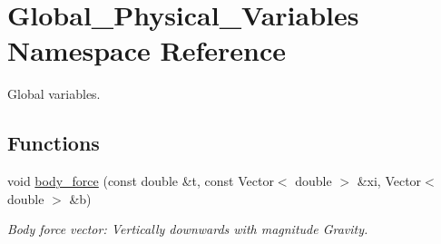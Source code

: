 \hypertarget{namespaceGlobal__Physical__Variables}{}\section{Global\+\_\+\+Physical\+\_\+\+Variables Namespace Reference}
\label{namespaceGlobal__Physical__Variables}


Global variables.  


\subsection*{Functions}
\begin{DoxyCompactItemize}
\item 
void \hyperlink{namespaceGlobal__Physical__Variables_a313e702a9e8fdec808702c9bbf38b192}{body\+\_\+force} (const double \&t, const Vector$<$ double $>$ \&xi, Vector$<$ double $>$ \&b)
\begin{DoxyCompactList}\small\item\em Body force vector\+: Vertically downwards with magnitude Gravity. \end{DoxyCompactList}\end{DoxyCompactItemize}
